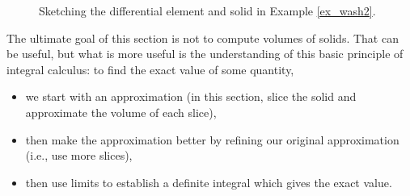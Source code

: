 \begin{figure}[t]
\centering
\qquad
{}
\qquad
{}
\caption{Sketching the differential element and solid in Example \ref{ex_wash2}.}
\end{figure}

The ultimate goal of this section is not to compute volumes of solids. That can be useful, but what is more useful is the understanding of this basic principle of integral calculus: to find the exact value of some quantity, 
\begin{itemize}
	\item we start with an approximation (in this section, slice the solid and approximate the volume of each slice), 
	\item then make the approximation better by refining our original approximation (i.e., use more slices), 
	\item	then use limits to establish a definite integral which gives the exact value.
\end{itemize}

